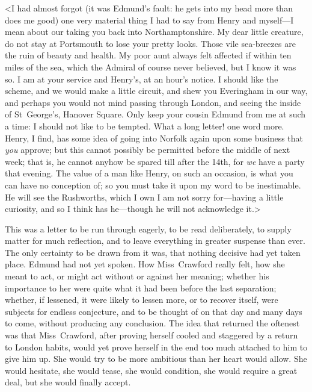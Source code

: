 <I had almost forgot (it was Edmund's fault: he gets into my head more than does me good) one very material thing I had to say from Henry and myself—I mean about our taking you back into Northamptonshire. My dear little creature, do not stay at Portsmouth to lose your pretty looks. Those vile sea-breezes are the ruin of beauty and health. My poor aunt always felt affected if within ten miles of the sea, which the Admiral of course never believed, but I know it was so. I am at your service and Henry's, at an hour's notice. I should like the scheme, and we would make a little circuit, and shew you Everingham in our way, and perhaps you would not mind passing through London, and seeing the inside of St~George's, Hanover Square. Only keep your cousin Edmund from me at such a time: I should not like to be tempted. What a long letter! one word more. Henry, I find, has some idea of going into Norfolk again upon some business that \textit{you}  approve; but this cannot possibly be permitted before the middle of next week; that is, he cannot anyhow be spared till after the 14th, for \textit{we}  have a party that evening. The value of a man like Henry, on such an occasion, is what you can have no conception of; so you must take it upon my word to be inestimable. He will see the Rushworths, which I own I am not sorry for—having a little curiosity, and so I think has he—though he will not acknowledge it.>

This was a letter to be run through eagerly, to be read deliberately, to supply matter for much reflection, and to leave everything in greater suspense than ever. The only certainty to be drawn from it was, that nothing decisive had yet taken place. Edmund had not yet spoken. How Miss~Crawford really felt, how she meant to act, or might act without or against her meaning; whether his importance to her were quite what it had been before the last separation; whether, if lessened, it were likely to lessen more, or to recover itself, were subjects for endless conjecture, and to be thought of on that day and many days to come, without producing any conclusion. The idea that returned the oftenest was that Miss~Crawford, after proving herself cooled and staggered by a return to London habits, would yet prove herself in the end too much attached to him to give him up. She would try to be more ambitious than her heart would allow. She would hesitate, she would tease, she would condition, she would require a great deal, but she would finally accept.

